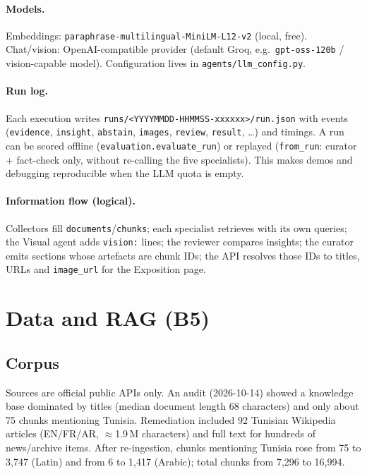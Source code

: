 \documentclass[11pt,a4paper]{article}
\begin{document}
\paragraph{Models.}
Embeddings: \texttt{paraphrase-multilingual-MiniLM-L12-v2} (local, free). Chat/vision: OpenAI-compatible provider (default Groq, e.g.\ \texttt{gpt-oss-120b} / vision-capable model). Configuration lives in \texttt{agents/llm\_config.py}.

\paragraph{Run log.}
Each execution writes \texttt{runs/<YYYYMMDD-HHMMSS-xxxxxx>/run.json} with events (\texttt{evidence}, \texttt{insight}, \texttt{abstain}, \texttt{images}, \texttt{review}, \texttt{result}, \ldots) and timings. A run can be scored offline (\texttt{evaluation.evaluate\_run}) or replayed (\texttt{from\_run}: curator + fact-check only, without re-calling the five specialists). This makes demos and debugging reproducible when the LLM quota is empty.

\paragraph{Information flow (logical).}
Collectors fill \texttt{documents}/\texttt{chunks}; each specialist retrieves with its own queries; the Visual agent adds \texttt{vision:} lines; the reviewer compares insights; the curator emits sections whose artefacts are chunk IDs; the API resolves those IDs to titles, URLs and \texttt{image\_url} for the Exposition page.

\section{Data and RAG (B5)}
\label{sec:rag}

\subsection{Corpus}
Sources are official public APIs only. An audit (2026-10-14) showed a knowledge base dominated by titles (median document length 68 characters) and only about 75 chunks mentioning Tunisia. Remediation included 92 Tunisian Wikipedia articles (EN/FR/AR, $\approx$1.9\,M characters) and full text for hundreds of news/archive items. After re-ingestion, chunks mentioning Tunisia rose from 75 to 3{,}747 (Latin) and from 6 to 1{,}417 (Arabic); total chunks from 7{,}296 to 16{,}994.
\end{document}
